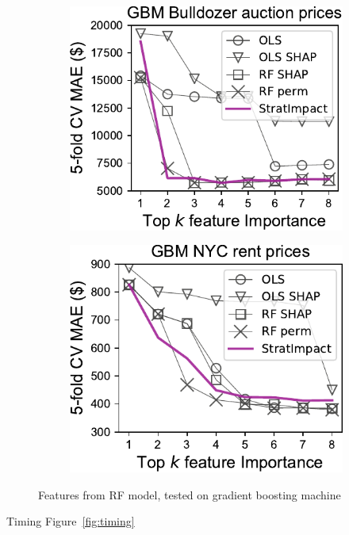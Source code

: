 \documentclass[11pt]{article}
\newcommand{\figref}[1]{Figure~\ref{#1}}
\begin{document}
\begin{figure}
\begin{subfigure}{.25\textwidth}
    \centering
\includegraphics[scale=0.5]{images/bulldozer-topk-GBM-Importance.pdf}
\end{subfigure}%
\hfill
\begin{subfigure}{.2\textwidth}
    \centering
\includegraphics[scale=0.5]{images/rent-topk-GBM-Importance.pdf}
\end{subfigure}
\caption[short]{Features from RF model, tested on gradient boosting machine}
\label{fig:topk}
\end{figure}

Timing \figref{fig:timing}
\end{document}
